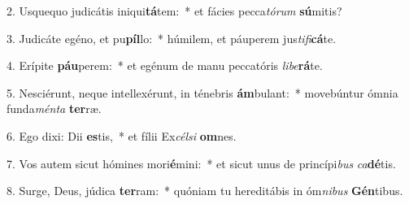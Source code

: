 2. Usquequo judicátis iniqui\textbf{tá}tem:~*  et fácies pecca\textit{tó}\textit{rum} \textbf{sú}mitis?\

3. Judicáte egéno, et pu\textbf{píl}lo:~*  húmilem, et páuperem jus\textit{ti}\textit{fi}\textbf{cá}te.\

4. Erípite \textbf{páu}perem:~*  et egénum de manu peccatóris \textit{li}\textit{be}\textbf{rá}te.\

5. Nesciérunt, neque intellexérunt, in ténebris \textbf{ám}bulant:~*  movebúntur ómnia funda\textit{mén}\textit{ta} \textbf{ter}ræ.\

6. Ego dixi: Dii \textbf{es}tis,~*  et fílii Ex\textit{cél}\textit{si} \textbf{om}nes.\

7. Vos autem sicut hómines mori\textbf{é}mini:~*  et sicut unus de princípi\textit{bus} \textit{ca}\textbf{dé}tis.\

8. Surge, Deus, júdica \textbf{ter}ram:~*  quóniam tu hereditábis in óm\textit{ni}\textit{bus} \textbf{Gén}tibus.\

